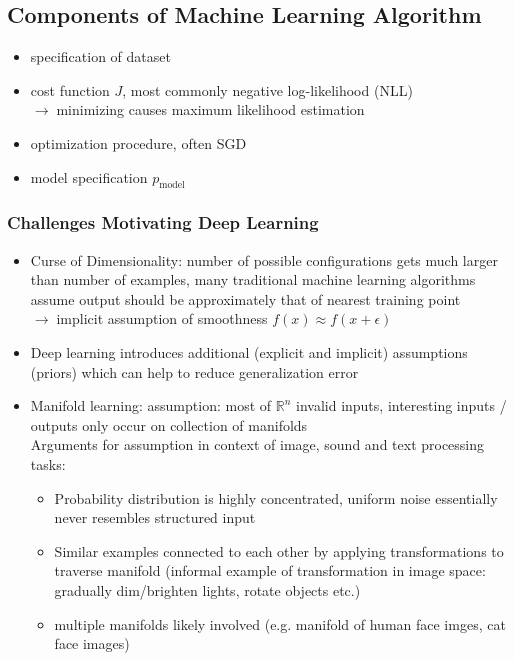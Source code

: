 \documentclass{article}
\newcommand{\arrow}{$\rightarrow\;$}
\newcommand{\R}{\mathbb{R}}
\newcommand{\p}[1]{p_\text{#1}}
\begin{document}
\subsection*{Components of Machine Learning Algorithm}
\begin{itemize}
    \item specification of dataset
    \item cost function $J$, most commonly negative log-likelihood (NLL) \\
    \arrow minimizing causes maximum likelihood estimation
    \item optimization procedure, often SGD
    \item model specification $\p{model}$
\end{itemize}

\subsubsection*{Challenges Motivating Deep Learning}
\begin{itemize}
    \item Curse of Dimensionality: number of possible configurations gets much larger than number of examples, 
    many traditional machine learning algorithms assume output should be approximately that of nearest training point \\
    \arrow implicit assumption of smoothness $f(x) \approx f(x + \epsilon)$
    \item Deep learning introduces additional (explicit and implicit) assumptions (priors) which can help to reduce generalization error
    \item Manifold learning: assumption: most of $\R^n$ invalid inputs, interesting inputs / outputs only occur on collection of manifolds \\
    Arguments for assumption in context of image, sound and text processing tasks:
    \begin{itemize}
        \item Probability distribution is highly concentrated, uniform noise essentially never resembles structured input
        \item Similar examples connected to each other by applying transformations to traverse manifold (informal example of transformation in image space: 
        gradually dim/brighten lights, rotate objects etc.)
        \item multiple manifolds likely involved (e.g. manifold of human face imges, cat face images)
    \end{itemize}
\end{itemize}
\end{document}
